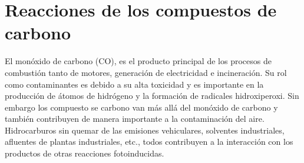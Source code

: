 \section{Reacciones de los compuestos de carbono}\label{recc}
El mon\'oxido de carbono (CO), es el producto principal de los procesos de combusti\'on tanto de motores, generaci\'on de electricidad e incineraci\'on. Su rol como contaminantes es debido a su alta toxicidad y es importante en la producci\'on de \'atomos de hidr\'ogeno y la formaci\'on de radicales hidroxiperoxi. Sin embargo los compuesto se carbono van m\'as all\'a del mon\'oxido de carbono y tambi\'en contribuyen de manera importante a la contaminaci\'on del aire. Hidrocarburos sin quemar de las emisiones vehiculares, solventes industriales, afluentes de plantas industriales, etc., todos contribuyen a la interacci\'on con los productos de otras reacciones fotoinducidas.

